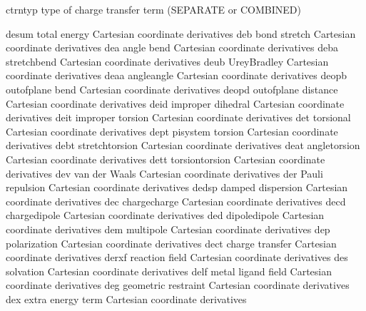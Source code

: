 \documentclass[letterpaper,11pt,english]{sphinxmanual}
\begin{document}

\begin{sphinxVerbatim}[commandchars=\\\{\}]
ctrntyp         type of charge transfer term (SEPARATE or COMBINED)
\end{sphinxVerbatim}


\begin{sphinxVerbatim}[commandchars=\\\{\}]
desum           total energy Cartesian coordinate derivatives
deb             bond stretch Cartesian coordinate derivatives
dea             angle bend Cartesian coordinate derivatives
deba            stretch\PYGZhy{}bend Cartesian coordinate derivatives
deub            Urey\PYGZhy{}Bradley Cartesian coordinate derivatives
deaa            angle\PYGZhy{}angle Cartesian coordinate derivatives
deopb           out\PYGZhy{}of\PYGZhy{}plane bend Cartesian coordinate derivatives
deopd           out\PYGZhy{}of\PYGZhy{}plane distance Cartesian coordinate derivatives
deid            improper dihedral Cartesian coordinate derivatives
deit            improper torsion Cartesian coordinate derivatives
det             torsional Cartesian coordinate derivatives
dept            pi\PYGZhy{}system torsion Cartesian coordinate derivatives
debt            stretch\PYGZhy{}torsion Cartesian coordinate derivatives
deat            angle\PYGZhy{}torsion Cartesian coordinate derivatives
dett            torsion\PYGZhy{}torsion Cartesian coordinate derivatives
dev             van der Waals Cartesian coordinate derivatives
der             Pauli repulsion Cartesian coordinate derivatives
dedsp           damped dispersion Cartesian coordinate derivatives
dec             charge\PYGZhy{}charge Cartesian coordinate derivatives
decd            charge\PYGZhy{}dipole Cartesian coordinate derivatives
ded             dipole\PYGZhy{}dipole Cartesian coordinate derivatives
dem             multipole Cartesian coordinate derivatives
dep             polarization Cartesian coordinate derivatives
dect            charge transfer Cartesian coordinate derivatives
derxf           reaction field Cartesian coordinate derivatives
des             solvation Cartesian coordinate derivatives
delf            metal ligand field Cartesian coordinate derivatives
deg             geometric restraint Cartesian coordinate derivatives
dex             extra energy term Cartesian coordinate derivatives
\end{sphinxVerbatim}
\end{document}

